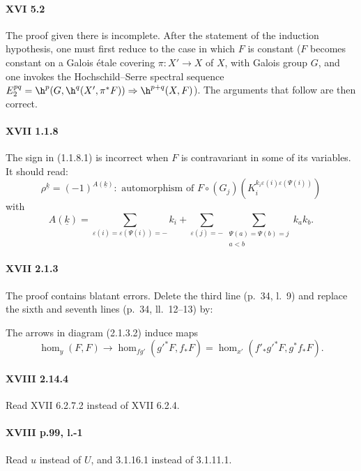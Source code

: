 \paragraph{XVI 5.2}
The proof given there is incomplete. After the statement of the induction
hypothesis, one must first reduce to the case in which $F$ is constant
($F$ becomes constant on a Galois \'etale covering $\pi:X'\to X$ of $X$,
with Galois group $G$, and one invokes the Hochschild--Serre spectral sequence
$E_2^{p q}=\h^p(G,\h^q(X',\pi^\ast F))\Rightarrow \h^{p+q}(X,F)$).
The arguments that follow are then correct.

\paragraph{XVII 1.1.8}
The sign in (1.1.8.1) is incorrect when $F$ is contravariant in some of its
variables. It should read:
\begin{equation*}\tag{1.1.8.1}
  \rho^{\underline k} = (-1)^{A(\underline k)}: \text{ automorphism of }
F\circ (G_j)\left(K_i^{k_i\varepsilon(i)\varepsilon(\Psi(i))}\right)
\end{equation*}
with
\[
  A(\underline k) = \sum_{\varepsilon(i) = \varepsilon(\Psi(i))=-} k_i + \sum_{\varepsilon(j)=-} \sum_{\substack{\Psi(a)=\Psi(b)=j \\ a<b}} k_a k_b .
\]

\paragraph{XVII 2.1.3}
The proof contains blatant errors. Delete the third line (p.~34, l.~9) and
replace the sixth and seventh lines (p.~34, ll.~12--13) by:

The arrows in diagram (2.1.3.2) induce maps
\[
  \hom_y(F,F) \to \hom_{f g'}({g'}^\ast F,f_\ast F) = \hom_{x'}(f'_\ast {g'}^\ast F,g^\ast f_\ast F) \text{.}
\]

\paragraph{XVIII 2.14.4}
Read XVII 6.2.7.2 instead of XVII 6.2.4.

\paragraph{XVIII p.99, l.-1}
Read $u$ instead of $U$, and 3.1.16.1 instead of 3.1.11.1.


